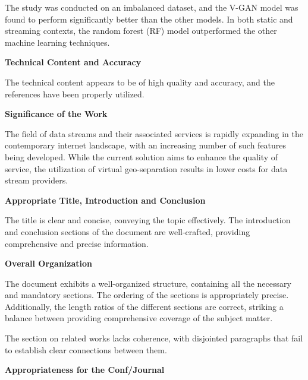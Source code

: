 \documentclass[a4paper,12pt]{article}
\begin{document}
The study was conducted on an imbalanced dataset, and the V-GAN model was found to perform significantly better than the other models. In both static and streaming contexts, the random forest (RF) model outperformed the other machine learning techniques.

\bigskip


\textbf{Technical Content and Accuracy}

The technical content appears to be of high quality and accuracy, and the references have been properly utilized.

\bigskip


\textbf{Significance of the Work}

The field of data streams and their associated services is rapidly expanding in the contemporary internet landscape, with an increasing number of such features being developed. While the current solution aims to enhance the quality of service, the utilization of virtual geo-separation results in lower costs for data stream providers.

\bigskip


\textbf{Appropriate Title, Introduction and Conclusion}

The title is clear and concise, conveying the topic effectively. The introduction and conclusion sections of the document are well-crafted, providing comprehensive and precise information.

\bigskip


\textbf{Overall Organization}

The document exhibits a well-organized structure, containing all the necessary and mandatory sections. The ordering of the sections is appropriately precise. Additionally, the length ratios of the different sections are correct, striking a balance between providing comprehensive coverage of the subject matter.

The section on related works lacks coherence, with disjointed paragraphs that fail to establish clear connections between them.

\bigskip


\textbf{Appropriateness for the Conf/Journal}
\end{document}
